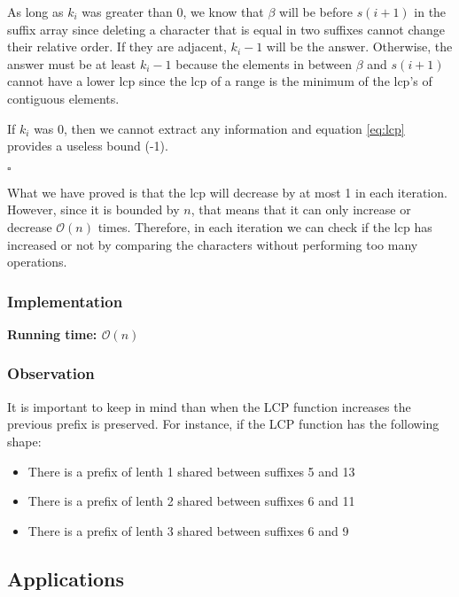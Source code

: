 As long as $k_i$ was greater than 0, we know that $\beta$ will
be before $s(i+1)$ in the suffix array since deleting a
character that is equal in two suffixes cannot change their
relative order. If they are adjacent, $k_i-1$ will be the answer.
Otherwise, the answer must be at least $k_i-1$ because the 
elements in between $\beta$ and $s(i+1)$ cannot  have a lower lcp
since the lcp of a range is the minimum of the lcp's of contiguous 
elements.

If $k_i$ was 0, then we cannot extract any information and 
equation \ref{eq:lcp} provides a useless bound (-1).

\hfill $\square$

What we have proved is that the lcp will decrease by at most 1 in 
each iteration. However, since it is bounded by $n$, that means
that it can only increase or decrease $\mathcal{O}(n)$ times. 
Therefore, in each iteration we can check if the lcp has increased
or not by comparing the characters without performing too many 
operations.

\subsubsection{Implementation}
\noindent \textbf{\boldmath Running time: $\mathcal{O}(n)$}

\subsubsection{Observation}
It is important to keep in mind than when the LCP
function increases the previous prefix is preserved.
For instance, if the LCP function has the following shape:
\begin{figure}[h!]
		\centering
		\label{fig:lcp_ex}
\end{figure}
\begin{itemize}
		\item There is a prefix of lenth 1 shared between suffixes
				5 and 13
		\item There is a prefix of lenth 2 shared between suffixes
				6 and 11
		\item There is a prefix of lenth 3 shared between suffixes
				6 and 9 
\end{itemize}

\subsection{Applications}
